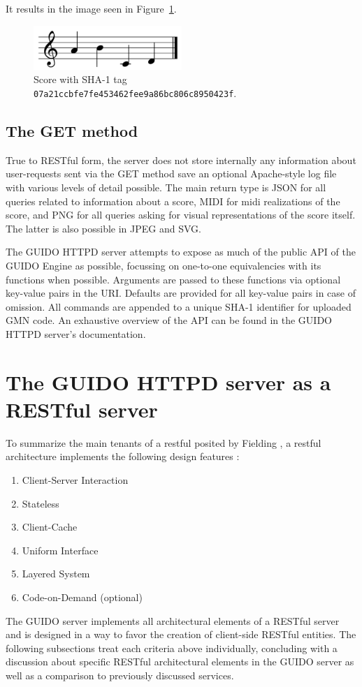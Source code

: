 \documentclass{article}
\begin{document}
It results in the image seen in Figure~\ref{fig:figure1}.
\begin{figure}[h]
  \centering
    \includegraphics[width=0.5\textwidth]{figure1}
  \cprotect\caption{\label{fig:figure1}Score with SHA-1 tag \verb=07a21ccbfe7fe453462fee9a86bc806c8950423f=.}
\end{figure}


\subsection{The GET method}\label{subsection:get}
True to RESTful form, the server does not store internally any information about user-requests sent via the GET method save an optional Apache-style log file with various levels of detail possible.  The main return type is JSON for all queries related to information about a score, MIDI for midi realizations of the score, and PNG for all queries asking for visual representations of the score itself.  The latter is also possible in JPEG and SVG.\par
The GUIDO HTTPD server attempts to expose as much of the public API of the GUIDO Engine as possible, focussing on one-to-one equivalencies with its functions when possible.  Arguments are passed to these functions via optional key-value pairs in the URI.  Defaults are provided for all key-value pairs in case of omission.  All commands are appended to a unique SHA-1 identifier for uploaded GMN code. An exhaustive overview of the API can be found in the GUIDO HTTPD server's documentation\cite{guidoserverdoc}.\par
\section{The GUIDO HTTPD server as a RESTful server}\label{section:guido-restful}
To summarize the main tenants of a restful posited by Fielding \cite{Fielding00}, a restful architecture implements the following design features :
\begin{enumerate}
\item Client-Server Interaction
\item Stateless
\item Client-Cache
\item Uniform Interface
\item Layered System
\item Code-on-Demand (optional)
\end{enumerate}
The GUIDO server implements all architectural elements of a RESTful server and is designed in a way to favor the creation of client-side RESTful entities.  The following subsections treat each criteria above individually, concluding with a  discussion about specific RESTful architectural elements in the GUIDO server as well as a comparison to previously discussed services.
\end{document}
